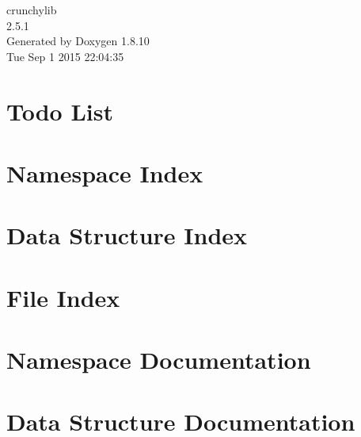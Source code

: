 \documentclass[twoside]{book}
\newcommand{\+}{\discretionary{\mbox{\scriptsize$\hookleftarrow$}}{}{}}
\newcommand{\clearemptydoublepage}{%
  \newpage{\pagestyle{empty}\cleardoublepage}%
}
\begin{document}
\hypersetup{pageanchor=false,
             bookmarks=true,
             bookmarksnumbered=true,
             pdfencoding=unicode
            }
\begin{titlepage}
\vspace*{7cm}
\begin{center}%
{\Large crunchylib \\[1ex]\large 2.\+5.\+1 }\\
\vspace*{1cm}
{\large Generated by Doxygen 1.8.10}\\
\vspace*{0.5cm}
{\small Tue Sep 1 2015 22:04:35}\\
\end{center}
\end{titlepage}
\clearemptydoublepage
\tableofcontents
\clearemptydoublepage
{}
\hypersetup{pageanchor=true}

\chapter{Todo List}
\label{todo}
\hypertarget{todo}{}

\chapter{Namespace Index}

\chapter{Data Structure Index}

\chapter{File Index}

\chapter{Namespace Documentation}






\chapter{Data Structure Documentation}

















\end{document}
